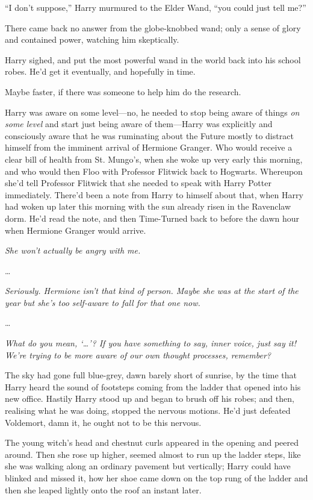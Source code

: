 “I don’t suppose,” Harry murmured to the Elder Wand, “you could just tell me?”

There came back no answer from the globe-knobbed wand; only a sense of glory and contained power, watching him skeptically.

Harry sighed, and put the most powerful wand in the world back into his school robes. He’d get it eventually, and hopefully in time.

Maybe faster, if there was someone to help him do the research.

Harry was aware on some level—no, he needed to stop being aware of things \emph{on some level} and start just being aware of them—Harry was explicitly and consciously aware that he was ruminating about the Future mostly to distract himself from the imminent arrival of Hermione Granger. Who would receive a clear bill of health from St. Mungo’s, when she woke up very early this morning, and who would then Floo with Professor Flitwick back to Hogwarts. Whereupon she’d tell Professor Flitwick that she needed to speak with Harry Potter immediately. There’d been a note from Harry to himself about that, when Harry had woken up later this morning with the sun already risen in the Ravenclaw dorm. He’d read the note, and then Time-Turned back to before the dawn hour when Hermione Granger would arrive.

\emph{She won’t actually be angry with me.}

…

\emph{Seriously. Hermione isn’t that kind of person. Maybe she was at the start of the year but she’s too self-aware to fall for that one now.}

…

\emph{What do you mean, ‘…’? If you have something to say, inner voice, just say it! We’re trying to be more aware of our own thought processes, remember?}

\later

The sky had gone full blue-grey, dawn barely short of sunrise, by the time that Harry heard the sound of footsteps coming from the ladder that opened into his new office. Hastily Harry stood up and began to brush off his robes; and then, realising what he was doing, stopped the nervous motions. He’d just defeated Voldemort, damn it, he ought not to be this nervous.

The young witch’s head and chestnut curls appeared in the opening and peered around. Then she rose up higher, seemed almost to run up the ladder steps, like she was walking along an ordinary pavement but vertically; Harry could have blinked and missed it, how her shoe came down on the top rung of the ladder and then she leaped lightly onto the roof an instant later.

